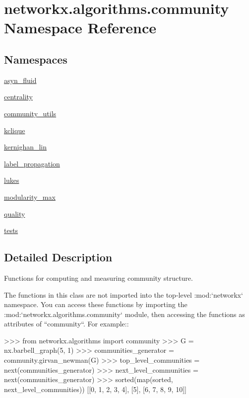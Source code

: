 \hypertarget{namespacenetworkx_1_1algorithms_1_1community}{}\section{networkx.\+algorithms.\+community Namespace Reference}
\label{namespacenetworkx_1_1algorithms_1_1community}
\subsection*{Namespaces}
\begin{DoxyCompactItemize}
\item 
 \hyperlink{namespacenetworkx_1_1algorithms_1_1community_1_1asyn__fluid}{asyn\+\_\+fluid}
\item 
 \hyperlink{namespacenetworkx_1_1algorithms_1_1community_1_1centrality}{centrality}
\item 
 \hyperlink{namespacenetworkx_1_1algorithms_1_1community_1_1community__utils}{community\+\_\+utils}
\item 
 \hyperlink{namespacenetworkx_1_1algorithms_1_1community_1_1kclique}{kclique}
\item 
 \hyperlink{namespacenetworkx_1_1algorithms_1_1community_1_1kernighan__lin}{kernighan\+\_\+lin}
\item 
 \hyperlink{namespacenetworkx_1_1algorithms_1_1community_1_1label__propagation}{label\+\_\+propagation}
\item 
 \hyperlink{namespacenetworkx_1_1algorithms_1_1community_1_1lukes}{lukes}
\item 
 \hyperlink{namespacenetworkx_1_1algorithms_1_1community_1_1modularity__max}{modularity\+\_\+max}
\item 
 \hyperlink{namespacenetworkx_1_1algorithms_1_1community_1_1quality}{quality}
\item 
 \hyperlink{namespacenetworkx_1_1algorithms_1_1community_1_1tests}{tests}
\end{DoxyCompactItemize}


\subsection{Detailed Description}
\begin{DoxyVerb}Functions for computing and measuring community structure.

The functions in this class are not imported into the top-level
:mod:`networkx` namespace. You can access these functions by importing
the :mod:`networkx.algorithms.community` module, then accessing the
functions as attributes of ``community``. For example::

    >>> from networkx.algorithms import community
    >>> G = nx.barbell_graph(5, 1)
    >>> communities_generator = community.girvan_newman(G)
    >>> top_level_communities = next(communities_generator)
    >>> next_level_communities = next(communities_generator)
    >>> sorted(map(sorted, next_level_communities))
    [[0, 1, 2, 3, 4], [5], [6, 7, 8, 9, 10]]\end{DoxyVerb}
 